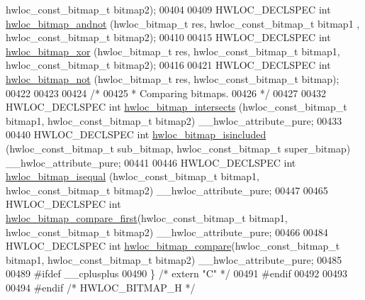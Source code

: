 \begin{DoxyCode}
      hwloc\_const\_bitmap\_t bitmap2);
00404 
00409 HWLOC\_DECLSPEC \textcolor{keywordtype}{int} \hyperlink{a00205_ga7ca5c72db65406b85aca032c8a990f9e}{hwloc\_bitmap\_andnot} (hwloc\_bitmap\_t res, hwloc\_const\_bitmap\_t bitmap1
      , hwloc\_const\_bitmap\_t bitmap2);
00410 
00415 HWLOC\_DECLSPEC \textcolor{keywordtype}{int} \hyperlink{a00205_ga205508218e09cb9befd0687f16409f09}{hwloc\_bitmap\_xor} (hwloc\_bitmap\_t res, hwloc\_const\_bitmap\_t bitmap1, 
      hwloc\_const\_bitmap\_t bitmap2);
00416 
00421 HWLOC\_DECLSPEC \textcolor{keywordtype}{int} \hyperlink{a00205_ga84cfdb4f8ab8c1f7e097728e613a2a3f}{hwloc\_bitmap\_not} (hwloc\_bitmap\_t res, hwloc\_const\_bitmap\_t bitmap);
00422 
00423 
00424 \textcolor{comment}{/*}
00425 \textcolor{comment}{ * Comparing bitmaps.}
00426 \textcolor{comment}{ */}
00427 
00432 HWLOC\_DECLSPEC \textcolor{keywordtype}{int} \hyperlink{a00205_gaefa070f9232857ba5a57297ea9a08ea2}{hwloc\_bitmap\_intersects} (hwloc\_const\_bitmap\_t bitmap1, 
      hwloc\_const\_bitmap\_t bitmap2) \_\_hwloc\_attribute\_pure;
00433 
00440 HWLOC\_DECLSPEC \textcolor{keywordtype}{int} \hyperlink{a00205_ga0526e03db81956fb02acc8260b66d6a4}{hwloc\_bitmap\_isincluded} (hwloc\_const\_bitmap\_t sub\_bitmap, 
      hwloc\_const\_bitmap\_t super\_bitmap) \_\_hwloc\_attribute\_pure;
00441 
00446 HWLOC\_DECLSPEC \textcolor{keywordtype}{int} \hyperlink{a00205_ga32376b1405e57472b73c3aa53bb39663}{hwloc\_bitmap\_isequal} (hwloc\_const\_bitmap\_t bitmap1, 
      hwloc\_const\_bitmap\_t bitmap2) \_\_hwloc\_attribute\_pure;
00447 
00465 HWLOC\_DECLSPEC \textcolor{keywordtype}{int} \hyperlink{a00205_gaa39cda1510ab721b5c012c76ead72365}{hwloc\_bitmap\_compare\_first}(hwloc\_const\_bitmap\_t bitmap1, 
      hwloc\_const\_bitmap\_t bitmap2) \_\_hwloc\_attribute\_pure;
00466 
00484 HWLOC\_DECLSPEC \textcolor{keywordtype}{int} \hyperlink{a00205_ga14cdbc0ef0a705e84999bd48a2e649f3}{hwloc\_bitmap\_compare}(hwloc\_const\_bitmap\_t bitmap1, 
      hwloc\_const\_bitmap\_t bitmap2) \_\_hwloc\_attribute\_pure;
00485 
00489 \textcolor{preprocessor}{#ifdef \_\_cplusplus}
00490 \} \textcolor{comment}{/* extern "C" */}
00491 \textcolor{preprocessor}{#endif}
00492 
00493 
00494 \textcolor{preprocessor}{#endif }\textcolor{comment}{/* HWLOC\_BITMAP\_H */}\textcolor{preprocessor}{}
\end{DoxyCode}
